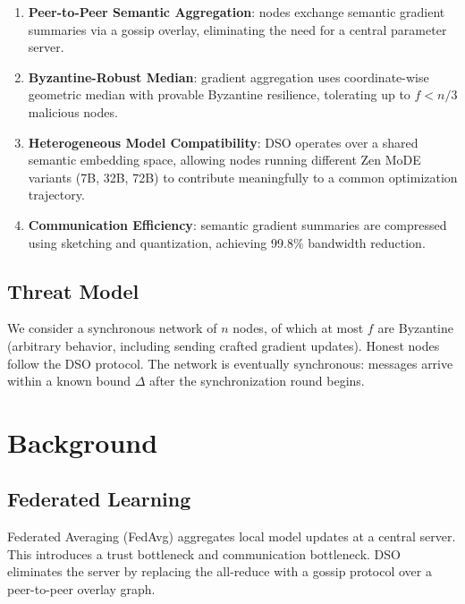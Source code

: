 \documentclass[11pt,a4paper]{article}
\begin{document}
\begin{enumerate}
    \item \textbf{Peer-to-Peer Semantic Aggregation}: nodes exchange semantic gradient
          summaries via a gossip overlay, eliminating the need for a central parameter server.
    \item \textbf{Byzantine-Robust Median}: gradient aggregation uses coordinate-wise
          geometric median with provable Byzantine resilience, tolerating up to $f < n/3$
          malicious nodes.
    \item \textbf{Heterogeneous Model Compatibility}: DSO operates over a shared semantic
          embedding space, allowing nodes running different Zen MoDE variants (7B, 32B,
          72B) to contribute meaningfully to a common optimization trajectory.
    \item \textbf{Communication Efficiency}: semantic gradient summaries are compressed
          using sketching and quantization, achieving 99.8\% bandwidth reduction.
\end{enumerate}

\subsection{Threat Model}

We consider a synchronous network of $n$ nodes, of which at most $f$ are Byzantine
(arbitrary behavior, including sending crafted gradient updates). Honest nodes follow
the DSO protocol. The network is eventually synchronous: messages arrive within a
known bound $\Delta$ after the synchronization round begins.

\section{Background}
\label{sec:background}

\subsection{Federated Learning}

Federated Averaging (FedAvg) \cite{mcmahan2017federated} aggregates local model updates
at a central server. This introduces a trust bottleneck and communication bottleneck.
DSO eliminates the server by replacing the all-reduce with a gossip protocol over a
peer-to-peer overlay graph.
\end{document}
